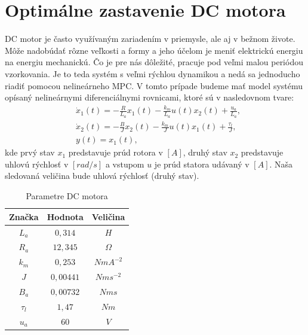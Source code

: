 \section{Optimálne zastavenie DC motora}

DC motor je často využívaným zariadením v priemysle, ale aj v bežnom živote. Môže nadobúdať rôzne veľkosti a formy a jeho účelom je meniť elektrickú energiu na energiu mechanickú. Čo je pre nás dôležité, pracuje pod veľmi malou periódou vzorkovania. Je to teda systém s veľmi rýchlou dynamikou a nedá sa jednoducho riadiť pomocou nelineárneho MPC. 
\label{math:model_DC}
V tomto prípade budeme mať model systému opísaný nelineárnymi diferenciálnymi rovnicami, ktoré sú v nasledovnom tvare:
\begin{subequations}
	\begin{align}
	& \dot{x}_1(t) = - \frac{R}{L_{a}}x_1(t) - \frac{k_{m}}{L_{a}}u(t)x_{2}(t) + \frac{u_a}{L_a},\\
	& \dot{x}_2(t) = - \frac{B}{J}x_2(t) - \frac{k_{m}}{J}u(t)x_{1}(t) + \frac{\tau_l}{J},\\
	& y(t) = x_{1}(t),
	\end{align}
\end{subequations}
kde prvý stav $x_{1}$ predstavuje prúd rotora v $[A]$, druhý stav $x_{2}$ predstavuje uhlovú rýchlosť v $[rad/s]$ a vstupom $u$ je prúd statora udávaný v $[A]$. Naša sledovaná veličina bude uhlová rýchlosť (druhý stav)\cite{bib2}.
\begin{table}[h!]
	\centering
	\caption{Parametre DC motora \cite{bib2}}
	\label{tab.1: Parametre DC motora}
	\begin{tabular}{c c c}
		\hline
		\textbf{Značka} & \textbf{Hodnota} & \textbf{Veličina} \\ \hline
		$L_{a}$ & $0,314$ & $H$ \\ 
		$R_{a}$ & $12,345$ & $\Omega$ \\ 
		$k_{m}$ & $0,253$ & $N m A^{-2}$ \\ 
		$J$ & $0,00441$ & $N m s^{-2}$ \\ 
		$B_{a}$ & $ 0,00732$ & $N m s$ \\ 
		$\tau_l$ & $1,47$ & $N m$ \\
		$u_{a}$ & $60$ & $V$ \\ \hline
	\end{tabular}
\end{table}

